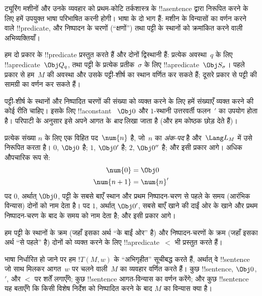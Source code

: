 \documentclass[../../../include/open-logic-section]{subfiles}
\begin{document}

\begin{explain}
ट्यूरिंग मशीनों और उनके व्यवहार को प्रथम-कोटि तर्कशास्त्र के
!!a{sentence} द्वारा निरूपित करने के लिए हमें उपयुक्त भाषा परिभाषित करनी
होगी। भाषा के दो भाग हैं: मशीन के विन्यासों का वर्णन करने वाले
!!{predicate}, और निष्पादन के चरणों (``क्षणों'') तथा पट्टी के स्थानों को
क्रमांकित करने वाली अभिव्यक्तियाँ।

हम दो प्रकार के !!{predicate} प्रस्तुत करते हैं और दोनों द्विस्थानी हैं:
प्रत्येक अवस्था~$q$ के लिए !!a{predicate}~$\Obj Q_q$, तथा पट्टी के
प्रत्येक प्रतीक~$\sigma$ के लिए !!a{predicate}~$\Obj S_\sigma$। पहले
प्रकार से हम~$M$ की अवस्था और उसके पट्टी-शीर्ष का स्थान वर्णित कर सकते
हैं; दूसरे प्रकार से पट्टी की सामग्री का वर्णन कर सकते हैं।

पट्टी-शीर्ष के स्थानों और निष्पादित चरणों की संख्या को व्यक्त करने के
लिए हमें संख्याएँ व्यक्त करने की कोई रीति चाहिए। इसके लिए !!a{constant}
~$\Obj 0$ और $1$-स्थानी उत्तरवर्ती फलन~$\prime$ का उपयोग होता है। परिपाटी
के अनुसार इसे अपने आगत के \emph{बाद} लिखा जाता है (और हम कोष्ठक छोड़
देते हैं)।

प्रत्येक संख्या $n$ के लिए एक विहित पद~$\num{n}$ है, जो~$n$ का
\emph{अंक-पद} है और~$\Lang L_M$ में उसे निरूपित करता है। $\num{0}$,
$\Obj 0$ है; $\num{1}$, $\Obj 0'$ है; $\num{2}$, $\Obj 0''$ है; और इसी
प्रकार आगे। अधिक औपचारिक रूप से:
\begin{align*}
\num{0} & = \Obj 0 \\
\num{n+1} &= \num{n}'
\end{align*}
पद $\num{0}$, अर्थात् $\Obj 0$, पट्टी के सबसे बाएँ स्थान और प्रथम
निष्पादन-चरण से पहले के समय (आरंभिक विन्यास) दोनों को नाम देता है। पद
$\num{1}$, अर्थात् $\Obj 0'$, सबसे बाएँ खाने की दाईं ओर के खाने और प्रथम
निष्पादन-चरण के बाद के समय को नाम देता है; और इसी प्रकार आगे।

हम पट्टी के स्थानों के क्रम (जहाँ इसका अर्थ ``के बाईं ओर'' है) और
निष्पादन-चरणों के क्रम (जहाँ इसका अर्थ ``से पहले'' है) दोनों को व्यक्त
करने के लिए !!a{predicate}~$<$ भी प्रस्तुत करते हैं।

भाषा निर्धारित हो जाने पर हम $!T(M, w)$ के ``अभिगृहीत'' सूचीबद्ध करते
हैं, अर्थात् वे !!{sentence} जो साथ मिलकर आगत~$w$ पर चलने वाली~$M$ का
व्यवहार वर्णित करते हैं। कुछ !!{sentence}, $\Obj 0$, $\prime$, और $<$
पर शर्तें लगाएँगे; कुछ !!{sentence} आगत-विन्यास का वर्णन करेंगे; और कुछ
!!{sentence} यह बताएँगे कि किसी विशेष निर्देश को निष्पादित करने के बाद
$M$ का विन्यास क्या है।
\end{explain}
\end{document}
